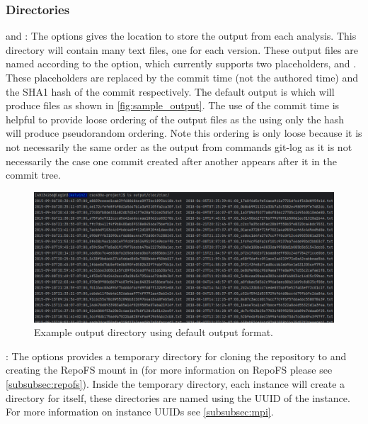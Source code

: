 \documentclass[11pt]{article}
\begin{document}
    \subsubsection{Directories}
    \label{subsubsec:directories}

     and : The  options gives the location to store the output from each analysis.
    This directory will contain many text files, one for each version.
    These output files are named according to the  option, which currently supports two placeholders,  and .
    These placeholders are replaced by the commit time (not the authored time) and the SHA1 hash of the commit respectively.
    The default output is  which will produce files as shown in \autoref{fig:sample_output}.
    The use of the commit time is helpful to provide loose ordering of the output files as the using only the hash will produce pseudorandom ordering.
    Note this ordering is only loose because it is not necessarily the same order as the output from commands git-log as it is not necessarily the case one commit created after another appears after it in the commit tree.

    \begin{figure}[H]
        \centering
        \includegraphics[width=\textwidth]{sample_output}
        \caption{Example output directory using default output format.}
        \label{fig:sample_output}
    \end{figure}

    : The  options provides a temporary directory for cloning the repository to and creating the RepoFS mount in (for more information on RepoFS please see \autoref{subsubsec:repofs}).  Inside the temporary directory, each instance will create a directory for itself, these directories are named using the UUID of the instance.
    For more information on instance UUIDs see \autoref{subsubsec:mpi}.
\end{document}
